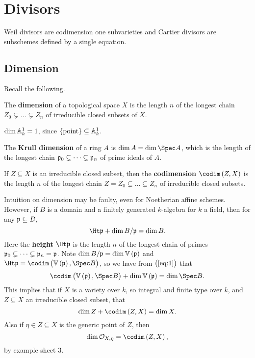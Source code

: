 \pagebreak

\section{Divisors}

Weil divisors are codimension one subvarieties and Cartier divisors are subschemes defined by a single equation.

\subsection{Dimension}

Recall the following.

\begin{definition*}
The \textbf{dimension} of a topological space $ X $ is the length $ n $ of the longest chain $ Z_0 \subsetneq \dots \subsetneq Z_n $ of irreducible closed subsets of $ X $.
\end{definition*}

\begin{example*}
$ \dim \AA_k^1 = 1 $, since $ \cbr{\text{point}} \subseteq \AA_k^1 $.
\end{example*}

\begin{definition*}
The \textbf{Krull dimension} of a ring $ A $ is $ \dim A = \dim \Spec A $, which is the length of the longest chain $ \ppp_0 \subsetneq \dots \subsetneq \ppp_n $ of prime ideals of $ A $.
\end{definition*}

\begin{definition*}
If $ Z \subseteq X $ is an irreducible closed subset, then the \textbf{codimension} $ \codim\br{Z, X} $ is the length $ n $ of the longest chain $ Z = Z_0 \subsetneq \dots \subsetneq Z_n $ of irreducible closed subsets.
\end{definition*}

\begin{remark*}
Intuition on dimension may be faulty, even for Noetherian affine schemes. However, if $ B $ is a domain and a finitely generated $ k $-algebra for $ k $ a field, then for any $ \ppp \subseteq B $,
\begin{equation}
\label{eq:1}
\Ht \ppp + \dim B / \ppp = \dim B.
\end{equation}
Here the \textbf{height} $ \Ht \ppp $ is the length $ n $ of the longest chain of primes $ \ppp_0 \subsetneq \dots \subsetneq \ppp_n = \ppp $. Note $ \dim B / \ppp = \dim \VV\br{\ppp} $ and $ \Ht \ppp = \codim\br{\VV\br{\ppp}, \Spec B} $, so we have from $ \br{\ref{eq:1}} $ that
$$ \codim\br{\VV\br{\ppp}, \Spec B} + \dim \VV\br{\ppp} = \dim \Spec B. $$
This implies that if $ X $ is a variety over $ k $, so integral and finite type over $ k $, and $ Z \subseteq X $ an irreducible closed subset, that
$$ \dim Z + \codim\br{Z, X} = \dim X. $$
Also if $ \eta \in Z \subseteq X $ is the generic point of $ Z $, then
$$ \dim \OOO_{X, \eta} = \codim\br{Z, X}, $$
by example sheet $ 3 $.
\end{remark*}

